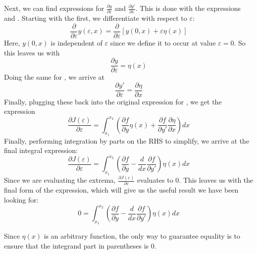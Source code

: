 Next, we can find expressions for $\frac{\partial y}{\partial \varepsilon}$ and $\frac{\partial y'}{\partial \varepsilon}$. This is done with the expressions  and . Starting with the first, we differentiate  with respect to $\varepsilon$:
\begin{equation}\label{eq:y diff epsilon}
    \frac{\partial}{\partial \varepsilon}y(\varepsilon,x)=\frac{\partial}{\partial \varepsilon}\left[y(0,x)+\varepsilon\eta(x)\right]
\end{equation}
Here, $y(0,x)$ is independent of $\varepsilon$ since we define it to occur at value $\varepsilon=0$. So this leaves us with
\begin{equation}\label{eq:diff y diff epsilon}
     \frac{\partial y}{\partial \varepsilon}= \eta(x)
\end{equation}
Doing the same for , we arrive at
\begin{equation}\label{diff y' diff epsilon}
     \frac{\partial y'}{\partial \varepsilon}= \frac{\partial \eta}{\partial x}
\end{equation}
Finally, plugging these back into the original expression for , we get the expression
\begin{equation}\label{eq:diff functional subs}
    \frac{\partial J(\varepsilon)}{\partial\varepsilon}= \int_{x_1}^{x_2}\left(\frac{\partial f}{\partial y}\eta(x)+\frac{\partial f}{\partial y'}\frac{\partial \eta}{\partial x}\right){dx}
\end{equation}
Finally, performing integration by parts on the RHS to simplify, we arrive at the final integral expression:
\begin{equation}\label{eq:diff functional final}
    \frac{\partial J(\varepsilon)}{\partial\varepsilon}= \int_{x_1}^{x_2}\left(\frac{\partial f}{\partial y}-\frac{d}{dx}\frac{\partial f}{\partial y'}\right)\eta(x){dx}
\end{equation}
Since we are evaluating the extrema, $\frac{\partial J(\varepsilon)}{\partial\varepsilon}$ evaluates to 0. This leaves us with the final form of the expression, which will give us the useful result we have been looking for:
\begin{equation}
    0= \int_{x_1}^{x_2}\left(\frac{\partial f}{\partial y}-\frac{d}{dx}\frac{\partial f}{\partial y'}\right)\eta(x){dx}
\end{equation}

Since $\eta(x)$ is an arbitrary function, the only way to guarantee equality is to ensure that the integrand part in parentheses is 0.

